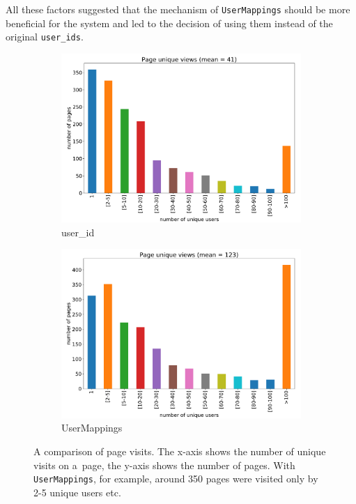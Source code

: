 All these factors suggested that the mechanism of \texttt{UserMappings} should be more beneficial for the system and led to the decision of using them instead of the original \texttt{user\_ids}.

\begin{figure}[H]
\centering
\begin{subfigure}{.5\textwidth}
  \centering
  \includegraphics[width=1.\linewidth]{obrazky-figures/page_unique_users.pdf}
  \caption{user\_id}
  \label{fig:page_views_comparison_user_id}
\end{subfigure}%
\begin{subfigure}{.5\textwidth}
  \centering
  \includegraphics[width=1.\linewidth]{obrazky-figures/page_unique_uid.pdf}
  \caption{UserMappings}
  \label{fig:page_views_comparison_uid}
\end{subfigure}
\caption{A comparison of page visits. The x-axis shows the number of unique visits on a~page, the y-axis shows the number of pages. With \texttt{UserMappings}, for example, around 350 pages were visited only by 2-5 unique users etc.}
\label{fig:page_views_comparison}
\end{figure}



